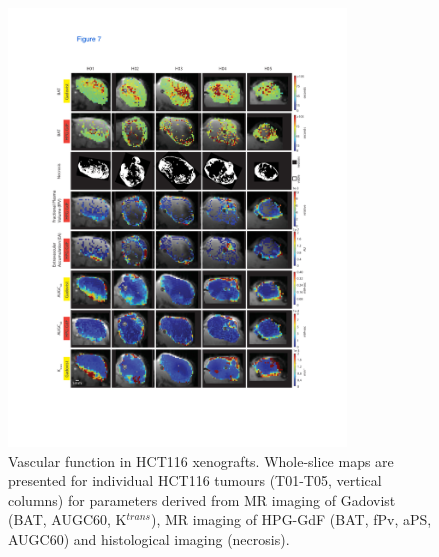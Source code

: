 \begin{figure}[htbp]   
 \begin{center}  
 \includegraphics[width=0.8\textwidth]{hpg/hpg-images/hpg_fig7-hct116.pdf}
 \caption{Vascular function in HCT116 xenografts. Whole-slice maps are presented for individual HCT116 tumours (T01-T05, vertical columns) for parameters derived from MR imaging of Gadovist (BAT, AUGC60, K$^{trans}$), MR imaging of HPG-GdF (BAT, fPv, aPS, AUGC60) and histological imaging (necrosis).}
 \label{hpgpaper:fig7}  
 \end{center}
\end{figure}

